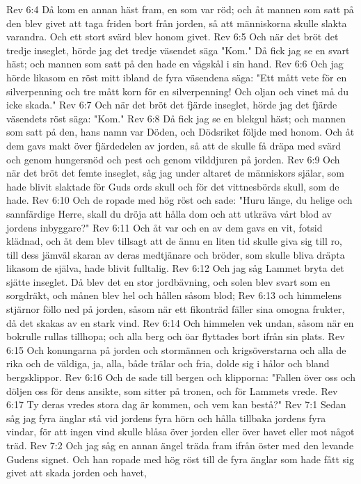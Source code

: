 Rev 6:4  Då kom en annan häst fram, en som var röd; och åt mannen som satt på den blev givet att taga friden bort från jorden, så att människorna skulle slakta varandra. Och ett stort svärd blev honom givet.
Rev 6:5  Och när det bröt det tredje inseglet, hörde jag det tredje väsendet säga "Kom." Då fick jag se en svart häst; och mannen som satt på den hade en vågskål i sin hand.
Rev 6:6  Och jag hörde likasom en röst mitt ibland de fyra väsendena säga: "Ett mått vete för en silverpenning och tre mått korn för en silverpenning! Och oljan och vinet må du icke skada."
Rev 6:7  Och när det bröt det fjärde inseglet, hörde jag det fjärde väsendets röst säga: "Kom."
Rev 6:8  Då fick jag se en blekgul häst; och mannen som satt på den, hans namn var Döden, och Dödsriket följde med honom. Och åt dem gavs makt över fjärdedelen av jorden, så att de skulle få dräpa med svärd och genom hungersnöd och pest och genom vilddjuren på jorden.
Rev 6:9  Och när det bröt det femte inseglet, såg jag under altaret de människors själar, som hade blivit slaktade för Guds ords skull och för det vittnesbörds skull, som de hade.
Rev 6:10  Och de ropade med hög röst och sade: "Huru länge, du helige och sannfärdige Herre, skall du dröja att hålla dom och att utkräva vårt blod av jordens inbyggare?"
Rev 6:11  Och åt var och en av dem gavs en vit, fotsid klädnad, och åt dem blev tillsagt att de ännu en liten tid skulle giva sig till ro, till dess jämväl skaran av deras medtjänare och bröder, som skulle bliva dräpta likasom de själva, hade blivit fulltalig.
Rev 6:12  Och jag såg Lammet bryta det sjätte inseglet. Då blev det en stor jordbävning, och solen blev svart som en sorgdräkt, och månen blev hel och hållen såsom blod;
Rev 6:13  och himmelens stjärnor föllo ned på jorden, såsom när ett fikonträd fäller sina omogna frukter, då det skakas av en stark vind.
Rev 6:14  Och himmelen vek undan, såsom när en bokrulle rullas tillhopa; och alla berg och öar flyttades bort ifrån sin plats.
Rev 6:15  Och konungarna på jorden och stormännen och krigsöverstarna och alla de rika och de väldiga, ja, alla, både trälar och fria, dolde sig i hålor och bland bergsklippor.
Rev 6:16  Och de sade till bergen och klipporna: "Fallen över oss och döljen oss för dens ansikte, som sitter på tronen, och för Lammets vrede.
Rev 6:17  Ty deras vredes stora dag är kommen, och vem kan bestå?"
Rev 7:1  Sedan såg jag fyra änglar stå vid jordens fyra hörn och hålla tillbaka jordens fyra vindar, för att ingen vind skulle blåsa över jorden eller över havet eller mot något träd.
Rev 7:2  Och jag såg en annan ängel träda fram ifrån öster med den levande Gudens signet. Och han ropade med hög röst till de fyra änglar som hade fått sig givet att skada jorden och havet,
